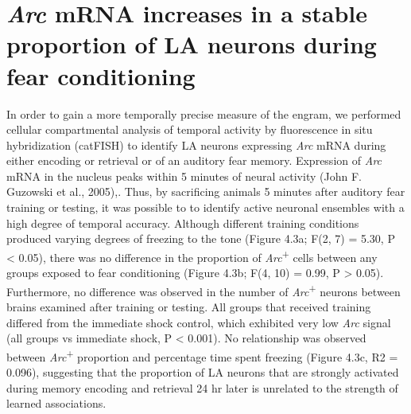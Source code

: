 \documentclass[12pt,a4paperpaper,]{report}
\begin{document}
\section{\texorpdfstring{\emph{Arc} mRNA increases in a stable
proportion of LA neurons during fear
conditioning}{Arc mRNA increases in a stable proportion of LA neurons during fear conditioning}}\label{arc-mrna-increases-in-a-stable-proportion-of-la-neurons-during-fear-conditioning}

In order to gain a more temporally precise measure of the engram, we
performed cellular compartmental analysis of temporal activity by
fluorescence in situ hybridization (catFISH) to identify LA neurons
expressing \emph{Arc} mRNA during either encoding or retrieval or of an
auditory fear memory. Expression of \emph{Arc} mRNA in the nucleus peaks
within 5 minutes of neural activity (John F. Guzowski et al., 2005),.
Thus, by sacrificing animals 5 minutes after auditory fear training or
testing, it was possible to to identify active neuronal ensembles with a
high degree of temporal accuracy. Although different training conditions
produced varying degrees of freezing to the tone (Figure 4.3a; F(2, 7) =
5.30, P \textless{} 0.05), there was no difference in the proportion of
\emph{Arc}\textsuperscript{+} cells between any groups exposed to fear
conditioning (Figure 4.3b; F(4, 10) = 0.99, P \textgreater{} 0.05).
Furthermore, no difference was observed in the number of
\emph{Arc}\textsuperscript{+} neurons between brains examined after
training or testing. All groups that received training differed from the
immediate shock control, which exhibited very low \emph{Arc} signal (all
groups vs immediate shock, P \textless{} 0.001). No relationship was
observed between \emph{Arc}\textsuperscript{+} proportion and percentage
time spent freezing (Figure 4.3c, R2 = 0.096), suggesting that the
proportion of LA neurons that are strongly activated during memory
encoding and retrieval 24 hr later is unrelated to the strength of
learned associations.
\end{document}
